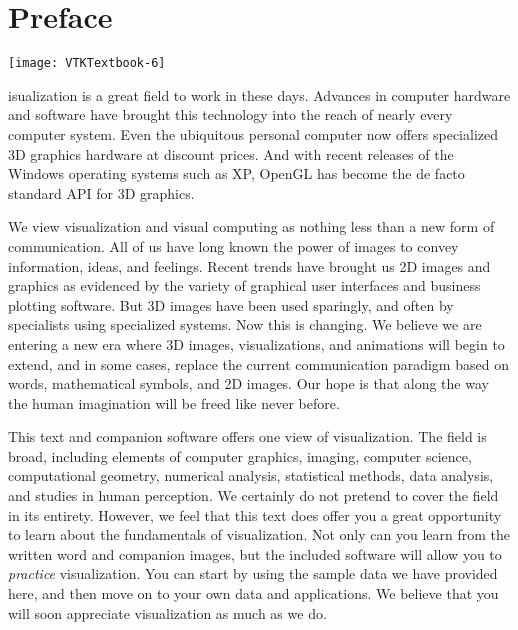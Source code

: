 
\chapter*{Preface}
\markright{}

\vspace{-7\baselineskip} %
\hfill
 \begin{minipage}{0.5\textwidth}
 \centering
 \texttt{[image: VTKTextbook-6]}
 \end{minipage}
\vspace{2\baselineskip}


isualization is a great field to work in these days. Advances in computer hardware and software have brought this technology into the reach of nearly every computer system. Even the ubiquitous personal computer now offers specialized 3D graphics hardware at discount prices. And with recent releases of the Windows operating systems such as XP, OpenGL has become the de facto standard API for 3D graphics.

 We view visualization and visual computing as nothing less than a new form of communication. All of us have long known the power of images to convey information, ideas, and feelings. Recent trends have brought us 2D images and graphics as evidenced by the variety of graphical user interfaces and business plotting software. But 3D images have been used sparingly, and often by specialists using specialized systems. Now this is changing. We believe we are entering a new era where 3D images, visualizations, and animations will begin to extend, and in some cases, replace the current communication paradigm based on words, mathematical symbols, and 2D images. Our hope is that along the way the human imagination will be freed like never before.

This text and companion software offers one view of visualization. The field is broad, including elements of computer graphics, imaging, computer science, computational geometry, numerical analysis, statistical methods, data analysis, and studies in human perception. We certainly do not pretend to cover the field in its entirety. However, we feel that this text does offer you a great opportunity to learn about the fundamentals of visualization. Not only can you learn from the written word and companion images, but the included software will allow you to \textit{practice} visualization. You can start by using the sample data we have provided here, and then move on to your own data and applications. We believe that you will soon appreciate visualization as much as we do.

